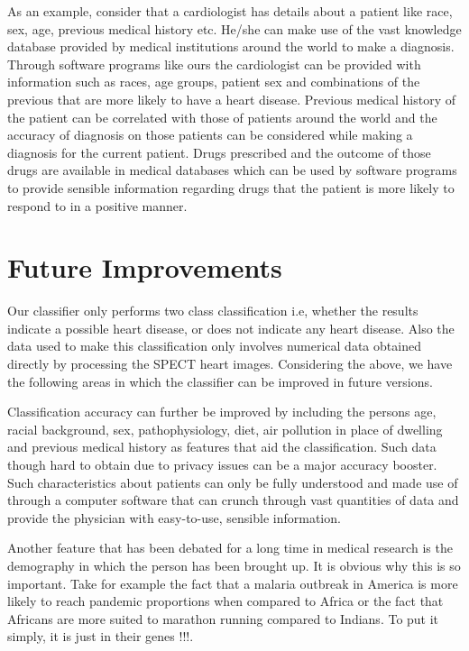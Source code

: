\documentclass{acm_proc_article-sp}
\begin{document}
As an example, consider that a cardiologist has details about a patient like race, sex, age, previous medical history etc. He/she can make use of the vast knowledge database provided by medical institutions around the world to make a diagnosis. Through software programs like ours the cardiologist can be provided with information such as races, age groups, patient sex and combinations of the previous that are more likely to have a heart disease. Previous medical history of the patient can be correlated with those of patients around the world and the accuracy of diagnosis on those patients can be considered while making a diagnosis for the current patient. Drugs prescribed and the outcome of those drugs are available in medical databases which can be used by software programs to provide sensible information regarding drugs that the patient is more likely to respond to in a positive manner.

\section{Future Improvements}

Our classifier only performs two class classification i.e, whether the results indicate a possible heart disease, or does not indicate any heart disease. Also the data used to make this classification only involves numerical data obtained directly by processing the SPECT heart images. Considering the above, we have the following areas in which the classifier can be improved in future versions.

Classification accuracy can further be improved by including the persons age, racial background, sex, pathophysiology, diet, air pollution in place of dwelling and previous medical history as features that aid the classification.  Such data though hard to obtain due to privacy issues can be a major accuracy booster. Such characteristics about patients can only be fully understood and made use of through a computer software that can crunch through vast quantities of data and provide the physician with easy-to-use, sensible information.

Another feature that has been debated for a long time in medical research is the demography in which the person has been brought up. It is obvious why this is so important. Take for example the fact that a malaria outbreak in America is more likely to reach pandemic proportions when compared to Africa or the fact that Africans are more suited to marathon running compared to Indians. To put it simply, it is just in their genes !!!.
\end{document}
